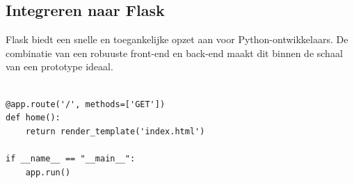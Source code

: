 \subsection{Integreren naar Flask}

Flask biedt een snelle en toegankelijke opzet aan voor Python-ontwikkelaars. De combinatie van een robuuste front-end en back-end maakt dit binnen de schaal van een prototype ideaal.

\begin{lstlisting}

@app.route('/', methods=['GET'])
def home():
	return render_template('index.html')

if __name__ == "__main__":
	app.run()
\end{lstlisting}


